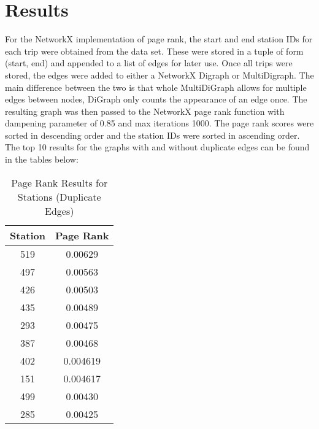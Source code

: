 \documentclass{article}
\begin{document}
\section{Results}
For the NetworkX implementation of page rank,  the start and end station IDs for each trip were obtained from the data set. These were stored in a tuple of form (start, end) and appended to a list of edges for later use. Once all trips were stored, the edges were added to either a NetworkX Digraph or MultiDigraph. The main difference between the two is that whole MultiDiGraph allows for multiple edges between nodes, DiGraph only counts the appearance of an edge once. The resulting graph was then passed to the NetworkX page rank function with dampening parameter of 0.85 and max iterations 1000. The page rank scores  were sorted in descending order and the station IDs were sorted in ascending order. The top 10 results for the graphs with and without duplicate edges can be found in the tables below: 
\begin{table}[h!]
\caption{Page Rank Results for Stations (Duplicate Edges)}
\centering
 \begin{tabular}{||c c||} 
 \hline
 Station & Page Rank \\ [0.5ex] 
 \hline\hline
 519 & 0.00629\\ 
 497 & 0.00563\\
 426 & 0.00503\\ 
 435 & 0.00489\\
 293 & 0.00475\\
 387 & 0.00468\\
 402 & 0.004619\\
 151 & 0.004617\\
 499 & 0.00430\\
 285 & 0.00425\\[1ex] 
 \hline
 \end{tabular}
 \end{table}
\end{document}
